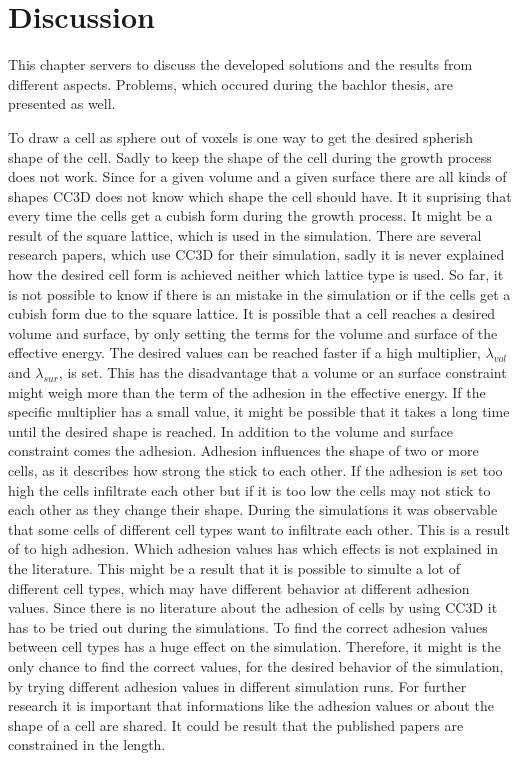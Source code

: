 \chapter{Discussion}
This chapter servers to discuss the developed solutions and the results from different aspects. Problems, which occured during the bachlor thesis, are presented as well.

To draw a cell as sphere out of voxels is one way to get the desired spherish shape of the cell. Sadly to keep the shape of the cell during the growth process does not work. Since for a given volume and a given surface there are all kinds of shapes \ac{CC3D} does not know which shape the cell should have. It it suprising that every time the cells get a cubish form during the growth process. It might be a result of the square lattice, which is used in the simulation. There are several research papers, which use \ac{CC3D} for their simulation, sadly it is never explained how the desired cell form is achieved neither which lattice type is used. So far, it is not possible to know if there is an mistake in the simulation or if the cells get a cubish form due to the square lattice. \newline
It is possible that a cell reaches a desired volume and surface, by only setting the terms for the volume and surface of the effective energy. The desired values can be reached faster if a high multiplier, $\lambda_{vol}$ and $\lambda_{sur}$, is set. This has the disadvantage that a volume or an surface constraint might weigh more than the term of the adhesion in the effective energy. If the specific multiplier has a small value, it might be possible that it takes a long time until the desired shape is reached. In addition to the volume and surface constraint comes the adhesion. Adhesion influences the shape of two or more cells, as it describes how strong the stick to each other. If the adhesion is set too high the cells infiltrate each other but if it is too low the cells may not stick to each other as they change their shape. During the simulations it was observable that some cells of different cell types want to infiltrate each other. This is a result of to high adhesion. Which adhesion values has which effects is not explained in the literature. This might be a result that it is possible to simulte a lot of different cell types, which may have different behavior at different adhesion values. Since there is no literature about the adhesion of cells by using \ac{CC3D} it has to be tried out during the simulations. To find the correct adhesion values between cell types has a huge effect on the simulation. Therefore, it might is the only chance to find the correct values, for the desired behavior of the simulation, by trying different adhesion values in different simulation runs. For further research it is important that informations like the adhesion values or about the shape of a cell are shared. It could be result that the published papers are constrained in the length.

